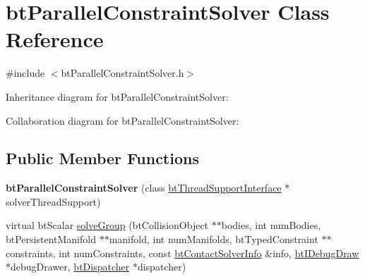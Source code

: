 \hypertarget{classbt_parallel_constraint_solver}{\section{bt\+Parallel\+Constraint\+Solver Class Reference}
\label{classbt_parallel_constraint_solver}
}


{\ttfamily \#include $<$bt\+Parallel\+Constraint\+Solver.\+h$>$}



Inheritance diagram for bt\+Parallel\+Constraint\+Solver\+:


Collaboration diagram for bt\+Parallel\+Constraint\+Solver\+:
\subsection*{Public Member Functions}
\begin{DoxyCompactItemize}
\item 
\hypertarget{classbt_parallel_constraint_solver_acb3d5063e1894e7340b9cc5b76feead4}{{\bfseries bt\+Parallel\+Constraint\+Solver} (class \hyperlink{classbt_thread_support_interface}{bt\+Thread\+Support\+Interface} $\ast$solver\+Thread\+Support)}\label{classbt_parallel_constraint_solver_acb3d5063e1894e7340b9cc5b76feead4}

\item 
virtual bt\+Scalar \hyperlink{classbt_parallel_constraint_solver_a2713bd22bd322034ba8470186105ff22}{solve\+Group} (bt\+Collision\+Object $\ast$$\ast$bodies, int num\+Bodies, bt\+Persistent\+Manifold $\ast$$\ast$manifold, int num\+Manifolds, bt\+Typed\+Constraint $\ast$$\ast$constraints, int num\+Constraints, const \hyperlink{structbt_contact_solver_info}{bt\+Contact\+Solver\+Info} \&info, \hyperlink{classbt_i_debug_draw}{bt\+I\+Debug\+Draw} $\ast$debug\+Drawer, \hyperlink{classbt_dispatcher}{bt\+Dispatcher} $\ast$dispatcher)
\end{DoxyCompactItemize}
